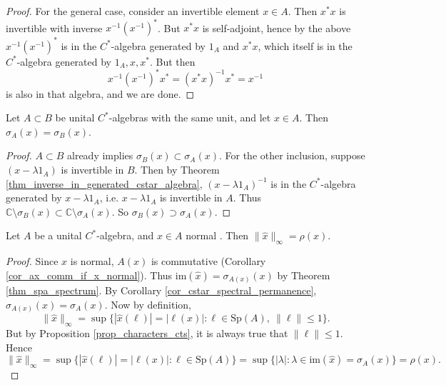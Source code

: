 \documentclass[12pt]{article}
\begin{document}
\begin{proof}
	For the general case, consider an invertible element $x\in A$. Then $x^\ast x$ is invertible with inverse $x^{-1}(x^{-1})^\ast$. But $x^\ast x$ is self-adjoint, hence by the above $x^{-1}(x^{-1})^\ast$ is in the $C^\ast$-algebra generated by $1_A$ and $x^\ast x$, which itself is in the $C^\ast$-algebra generated by $1_A, x, x^\ast$. But then 
	\begin{equation*}
		x^{-1}(x^{-1})^\ast x^\ast = (x^\ast x)^{-1}x^\ast = x^{-1}
	\end{equation*}
	is also in that algebra, and we are done.
\end{proof}

\begin{corollary}
\label{cor_cstar_spectral_permanence}
	Let $A\subset B$ be unital $C^\ast$-algebras with the same unit, and let $x\in A$. Then $\sigma_A(x)=\sigma_B(x)$.
\end{corollary}
\begin{proof}
	$A\subset B$ already implies $\sigma_B(x)\subset\sigma_A(x)$. For the other inclusion, suppose $(x-\lambda 1_A)$ is invertible in $B$. Then by Theorem \ref{thm_inverse_in_generated_cstar_algebra}, $(x-\lambda 1_A)^{-1}$ is in the $C^\ast$-algebra generated by $x-\lambda 1_A$, i.e. $x-\lambda 1_A$ is invertible in $A$. Thus $\mathbb{C}\setminus\sigma_B(x)\subset\mathbb{C}\setminus\sigma_A(x)$. So $\sigma_B(x)\supset\sigma_A(x)$. 
\end{proof}

\begin{corollary}
	Let $A$ be a unital $C^\ast$-algebra, and $x\in A$ normal . Then $\|\hat{x}\|_\infty = \rho(x)$.
\end{corollary}
\begin{proof}
	Since $x$ is normal, $A(x)$ is commutative (Corollary \ref{cor_ax_comm_if_x_normal}). Thus $\text{im}(\hat{x})=\sigma_{A(x)}(x)$ by Theorem \ref{thm_spa_spectrum}. By Corollary \ref{cor_cstar_spectral_permanence}, $\sigma_{A(x)}(x)=\sigma_A(x)$. Now by definition, 
	\begin{equation*}
		\|\hat{x}\|_\infty = \sup\{|\hat{x}(\ell)|=|\ell(x)| : \ell\in\text{Sp}(A), \ \|\ell\|\leq 1 \}.
	\end{equation*}
	But by Proposition \ref{prop_characters_cts}, it is always true that $\|\ell\|\leq 1$. Hence 
	\begin{equation*}
		\|\hat{x}\|_\infty = \sup\{|\hat{x}(\ell)|=|\ell(x)| : \ell\in\text{Sp}(A)\} = \sup\{|\lambda| : \lambda\in\text{im}(\hat{x})=\sigma_A(x)\}=\rho(x).
	\end{equation*}
\end{proof}
\end{document}
